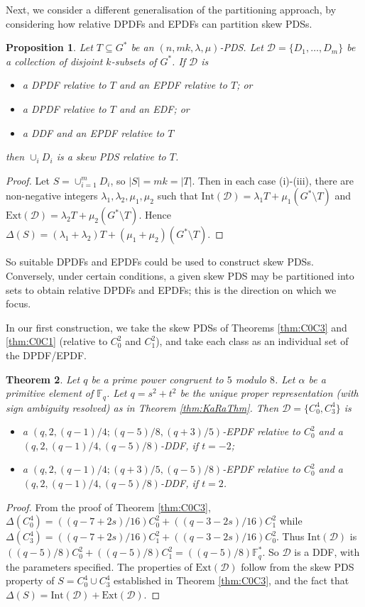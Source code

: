 \documentclass[12pt, a4paper]{article}
\newtheorem{theorem}{Theorem}[section]
\newtheorem{proposition}[theorem]{Proposition}
\theoremstyle{definition}
\begin{document}
Next, we consider a different generalisation of the partitioning approach, by considering how relative DPDFs and EPDFs can partition skew PDSs.
\begin{proposition}
Let $T \subseteq G^*$ be an $(n,mk,\lambda,\mu)$-PDS.  Let $\mathcal{D}=\{D_1,\ldots,D_m\}$ be a collection of disjoint $k$-subsets of $G^*$.  If $\mathcal{D}$ is 
\begin{itemize}
\item[(i)] a DPDF relative to $T$ and an EPDF relative to $T$; or
\item[(ii)] a DPDF relative to $T$ and an EDF; or
\item[(iii)] a DDF and an EPDF relative to $T$
\end{itemize}    
then $\cup_i D_i$ is a skew PDS relative to $T$.
\end{proposition}
\begin{proof}
Let $S=\cup_{i=1}^m D_i$, so $|S|=mk=|T|$.   Then in each case (i)-(iii), there are non-negative integers $\lambda_1,\lambda_2,\mu_1,\mu_2$ such that 
$\mathrm{Int}(\mathcal{D})=\lambda_1 T + \mu_1 (G^* \setminus T) $ and $\mathrm{Ext}(\mathcal{D})=\lambda_2 T + \mu_2 (G^* \setminus T)$. Hence $\Delta(S)=(\lambda_1+\lambda_2)T +(\mu_1+\mu_2)(G^* \setminus T)$.
\end{proof}

So suitable DPDFs and EPDFs could be used to construct skew PDSs.  Conversely, under certain conditions, a given skew PDS may be partitioned into sets to obtain relative DPDFs and EPDFs; this is the direction on which we focus.

In our first construction, we take the skew PDSs of Theorems \ref{thm:C0C3} and \ref{thm:C0C1} (relative to $C_0^2$ and $C_1^2$), and take each class as an individual set of the DPDF/EPDF.  

\begin{theorem}
Let $q$ be a prime power congruent to $5$ modulo $8$. Let $\alpha$ be a primitive element of $\mathbb{F}_q$. Let $q=s^2+t^2$ be the unique proper representation (with sign ambiguity resolved) as in Theorem \ref{thm:KaRaThm}. Then $\mathcal{D}=\{C_0^4,C_3^4\}$ is 
\begin{itemize}
\item[(i)] a $(q,2,(q-1)/4; (q-5)/8,(q+3)/5)$-EPDF relative to $C_0^2$ and a $(q,2,(q-1)/4,(q-5)/8)$-DDF, if $t=-2$;
\item[(ii)] a $(q,2,(q-1)/4;(q+3)/5, (q-5)/8)$-EPDF relative to $C_0^2$ and a $(q,2,(q-1)/4,(q-5)/8)$-DDF, if $t=2$.
\end{itemize}
\end{theorem}
\begin{proof}
From the proof of Theorem \ref{thm:C0C3}, $\Delta(C_0^4)=((q-7+2s)/16)C_0^2 + ((q-3-2s)/16)C_1^2$ while $\Delta(C_3^4)=((q-7+2s)/16)C_1^2 + ((q-3-2s)/16)C_0^2$.  Thus $\mathrm{Int}(\mathcal{D})$ is $((q-5)/8) C_0^2 + ((q-5)/8) C_1^2=((q-5)/8) \mathbb{F}_q^*$.  So $\mathcal{D}$ is a DDF, with the parameters specified.  The properties of $\mathrm{Ext}(\mathcal{D})$ follow from the skew PDS property of $S=C_0^4 \cup C_3^4$ established in Theorem \ref{thm:C0C3}, and the fact that $\Delta(S)=\mathrm{Int}(\mathcal{D}) + \mathrm{Ext}(\mathcal{D})$.
\end{proof}
\end{document}
